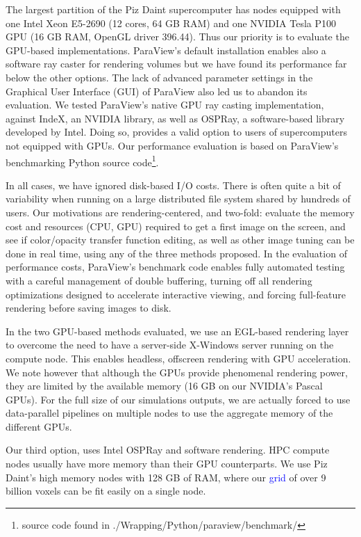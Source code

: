 \documentclass[5p,times]{elsarticle}
\begin{document}
The largest partition of the Piz Daint supercomputer has nodes equipped
with one Intel Xeon E5-2690 (12 cores, 64 GB RAM) and one NVIDIA
Tesla P100 GPU (16 GB RAM, OpenGL driver 396.44). Thus our priority is to evaluate
the GPU-based implementations.
ParaView's default installation enables also a software ray caster for rendering volumes but we have found its performance far
below the other options. The lack of advanced parameter settings in the Graphical
User Interface (GUI) of ParaView also led us to abandon its evaluation. We tested ParaView's native GPU
ray casting implementation, against IndeX, an NVIDIA library, as well as OSPRay, a software-based library developed by Intel.
Doing so, provides a valid option to users of supercomputers not equipped with GPUs.
Our performance evaluation is based on ParaView's benchmarking Python source
code\footnote{source code found in ./Wrapping/Python/paraview/benchmark/}.

In all cases, we have ignored disk-based I/O costs. There is often quite
a bit of variability when running on a large distributed file system shared by
hundreds of users. Our motivations are rendering-centered, and two-fold:
evaluate the memory cost and resources (CPU, GPU) required to get a first image
on the screen, and see if color/opacity transfer
function editing, as well as other image tuning can be done in real time, using
any of the three methods proposed. In the evaluation of performance costs, ParaView's
benchmark code enables fully automated testing with a careful management of
double buffering, turning off all rendering optimizations designed to accelerate
interactive viewing, and forcing full-feature rendering before saving images to disk.

In the two GPU-based methods evaluated, we use an EGL-based rendering layer \cite{EGL} to
overcome the need to have a server-side X-Windows server running on the compute node.
This enables headless, offscreen rendering with GPU acceleration. We note however that although
the GPUs provide phenomenal rendering power, they are limited by the available memory
(16 GB on our NVIDIA's Pascal GPUs). For the full size of our simulations outputs,
we are actually forced to use data-parallel pipelines on multiple nodes to use
the aggregate memory of the different GPUs.

Our third option, uses Intel OSPRay and software rendering. HPC compute nodes usually
have more memory than their GPU counterparts. We use Piz Daint's high memory nodes
with 128 GB of RAM, where our \textcolor{blue}{grid} of over 9 billion voxels can be fit
easily on a single node.
\end{document}
